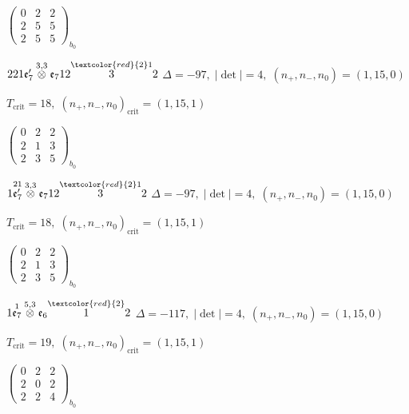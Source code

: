 \documentclass[10pt]{article}
\begin{document}
\hspace{2em}$\left(\begin{smallmatrix}0 & 2 & 2 \\ 2 & 5 & 5 \\ 2 & 5 & 5\end{smallmatrix}\right)_{\!b_0}$

\smallskip

$221\mathfrak{e}_7'\overset{3,3}{\otimes}\mathfrak{e}_712\overset{\textcolor{red}{2}1}{3}2$ \quad $\Delta=-97,\; |\det|=4,\; (n_+,n_-,n_0)=(1,15,0)$

\hspace{1em}$T_{\text{crit}}=18,\; (n_+,n_-,n_0)_{\text{crit}}=(1,15,1)$

\hspace{2em}$\left(\begin{smallmatrix}0 & 2 & 2 \\ 2 & 1 & 3 \\ 2 & 3 & 5\end{smallmatrix}\right)_{\!b_0}$

\smallskip

$1\overset{21}{\mathfrak{e}_7'}\overset{3,3}{\otimes}\mathfrak{e}_712\overset{\textcolor{red}{2}1}{3}2$ \quad $\Delta=-97,\; |\det|=4,\; (n_+,n_-,n_0)=(1,15,0)$

\hspace{1em}$T_{\text{crit}}=18,\; (n_+,n_-,n_0)_{\text{crit}}=(1,15,1)$

\hspace{2em}$\left(\begin{smallmatrix}0 & 2 & 2 \\ 2 & 1 & 3 \\ 2 & 3 & 5\end{smallmatrix}\right)_{\!b_0}$

\smallskip

$1\overset{1}{\mathfrak{e}_7}\overset{5,3}{\otimes}\mathfrak{e}_6\overset{\textcolor{red}{2}}{1}2$ \quad $\Delta=-117,\; |\det|=4,\; (n_+,n_-,n_0)=(1,15,0)$

\hspace{1em}$T_{\text{crit}}=19,\; (n_+,n_-,n_0)_{\text{crit}}=(1,15,1)$

\hspace{2em}$\left(\begin{smallmatrix}0 & 2 & 2 \\ 2 & 0 & 2 \\ 2 & 2 & 4\end{smallmatrix}\right)_{\!b_0}$
\end{document}
